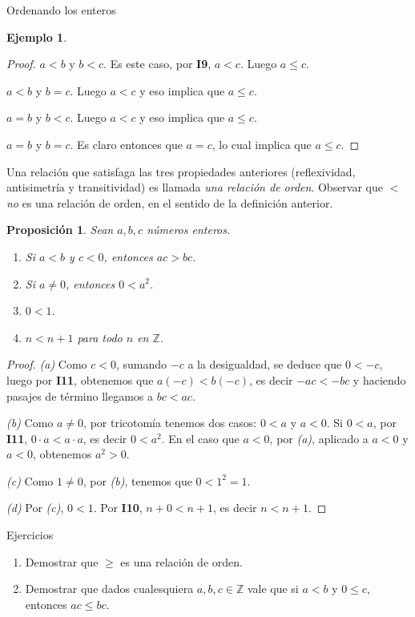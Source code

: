 \documentclass[11pt,spanish,makeidx]{amsbook}
\newtheorem{proposicion}[teorema]{Proposici\'on}
\theoremstyle{definition}
\newtheorem{ejemplo}{Ejemplo}[section]
\theoremstyle{remark}
\begin{document}
\begin{section}{Ordenando los enteros}
\begin{ejemplo}
\begin{proof}
$a<b$ y $b<c$. Es este caso, por  {\bf I9}, $a<c$. Luego $a\le c$.

$a<b$ y $b=c$. Luego $a<c$ y eso implica que $a\le c$.

$a=b$ y $b<c$. Luego $a<c$ y eso implica que $a\le c$.

$a=b$ y $b=c$. Es claro entonces que $a=c$, lo cual implica que $a\le c$.
\end{proof}
\end{ejemplo}

Una relación que satisfaga las tres propiedades anteriores (reflexividad, antisimetría y transitividad) es llamada {\em una relación de orden}. Observar que $<$ {\em no} es una relación de orden, en el sentido de la definición anterior. 

\begin{proposicion}\label{prop-0-menor-1} Sean $a,b,c$ números enteros. 
	\begin{enumerate}
		\item[{\it (a)}] Si  $a < b$ y $c < 0$, entonces $ac > bc$.
		\item[{\it (b)}] Si $a \ne 0$, entonces  $0 < a^2$. 
		\item[{\it (c)}] \label{item-0-menor-1} $0 < 1$.
		\item[{\it (d)}] $n < n+1$ para todo $n$ en $\mathbb Z$.
	\end{enumerate}
\end{proposicion}
\begin{proof}
	{\it (a)} Como $c < 0$, sumando $-c$ a la desigualdad, se deduce que $0 < -c$, luego por {\bf I11}, obtenemos que $a(-c) < b(-c)$, es decir $-ac < -bc$ y haciendo pasajes de término llegamos a $bc < ac$. 
	
	{\it (b)} Como $a \ne 0$, por tricotomía tenemos dos casos: $ 0<a$  y $a <0$. Si $0 < a$, por {\bf I11}, $0 \cdot a < a \cdot a$,  es decir $0 < a^2$. En  el caso que $a <0$, por {\it (a)}, aplicado a $a<0$ y $a<0$, obtenemos $a^2 >0$.
	
	{\it (c)} Como $1 \ne 0$, por {\it (b)}, tenemos que $0 < 1^2 = 1$.
	
	{\it (d)} Por {\it (c)}, $0 < 1$. Por  {\bf I10}, $n + 0 < n + 1$, es decir  $n < n+1$.
\end{proof}
\begin{subsection}{Ejercicios}\label{ejerciciosorden}
\begin{enumerate}
\item Demostrar que $\ge$ es una relación de orden.
\item Demostrar que dados cualesquiera $a,b,c \in \mathbb Z$ vale que si $a< b$ y $0\le c$, entonces $ac \le bc$. 
\end{enumerate}
\end{subsection}


\end{section}
\end{document}
